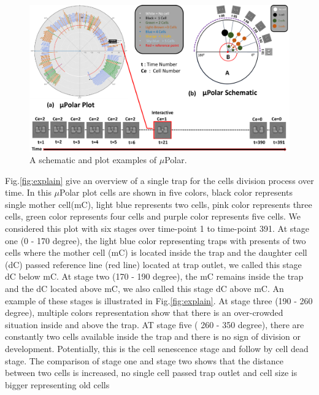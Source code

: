 \documentclass[conference]{IEEEtran}
\begin{document}
\begin{figure}
\centering
\includegraphics[width=\textwidth,height=10 cm]{Patterns/polar.pdf}
\caption{A schematic and plot examples of $\mu$Polar.}
\label{fig:polar}
\end{figure}

 Fig.\ref{fig:explain} give an overview of a single trap for the cells division process over time. In this $\mu$Polar plot cells are shown in five colors, black color represents single mother cell(mC), light blue represents two cells, pink color represents three cells, green color represents four cells and purple color represents five cells. We considered this plot with six stages over time-point 1 to time-point 391. At stage one (0 - 170 degree), the light blue color representing traps with presents of two cells where the mother cell (mC) is located inside the trap and the daughter cell (dC) passed reference line (red line) located at trap outlet, we called this stage dC below mC. At stage two (170 - 190 degree), the mC remains inside the trap and the dC located above mC, we also called this stage dC above mC.  An example of these stages is illustrated in Fig.\ref{fig:explain}. At stage three (190 - 260 degree), multiple colors representation show that there is an over-crowded situation inside and above the trap. AT stage five ( 260 - 350 degree), there are constantly two cells available inside the trap and there is no sign of division or development. Potentially, this is the cell senescence stage and follow by cell dead stage. The comparison of stage one and stage two shows that the distance between two cells is increased, no single cell passed trap outlet and cell size is bigger representing old cells            
\end{document}
